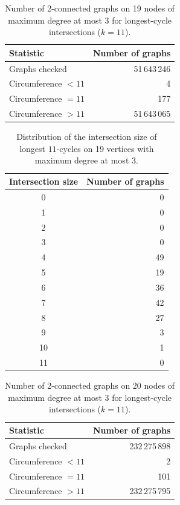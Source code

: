 \begin{table}[ht]
\centering
\caption{Number of 2-connected graphs on 19 nodes of maximum degree at most 3 for longest-cycle intersections ($k=11$).}
\label{tab:summary-geng-2con-n19}
\begin{tabular}{lr}
\toprule
Statistic & Number of graphs \\
\midrule
Graphs checked & 51\,643\,246 \\
Circumference $<11$ & 4 \\
Circumference $=11$ & 177 \\
Circumference $>11$ & 51\,643\,065 \\
\bottomrule
\end{tabular}
\end{table}


\begin{table}[ht]
\centering
\caption{Distribution of the intersection size of longest $11$-cycles on 19 vertices with maximum degree at most 3.}
\label{tab:intersection-d19d3}
\begin{tabular}{cr}
\toprule
Intersection size & Number of graphs \\
\midrule
0 & 0 \\
1 & 0 \\
2 & 0 \\
3 & 0 \\
4 & 49 \\
5 & 19 \\
6 & 36 \\
7 & 42 \\
8 & 27 \\
9 & 3 \\
10 & 1 \\
11 & 0 \\
\bottomrule
\end{tabular}
\end{table}

\begin{table}[ht]
\centering
\caption{Number of 2-connected graphs on 20 nodes of maximum degree at most 3 for longest-cycle intersections ($k=11$).}
\label{tab:summary-geng-2con-n20}
\begin{tabular}{lr}
\toprule
Statistic & Number of graphs \\
\midrule
Graphs checked & 232\,275\,898 \\
Circumference $<11$ & 2 \\
Circumference $=11$ & 101 \\
Circumference $>11$ & 232\,275\,795 \\
\bottomrule
\end{tabular}
\end{table}


